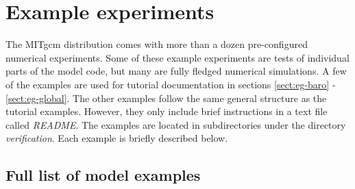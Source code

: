 \section{Example experiments}
\label{sect:modelExamples}


The MITgcm distribution comes with more than a dozen pre-configured
numerical experiments. Some of these example experiments are tests of
individual parts of the model code, but many are fully fledged
numerical simulations. A few of the examples are used for tutorial
documentation in sections \ref{sect:eg-baro} - \ref{sect:eg-global}.
The other examples follow the same general structure as the tutorial
examples. However, they only include brief instructions in a text file
called {\it README}.  The examples are located in subdirectories under
the directory \textit{verification}. Each example is briefly described
below.

\subsection{Full list of model examples}

